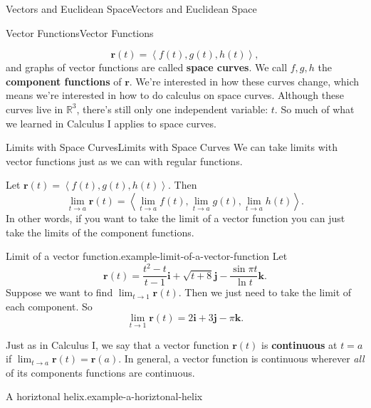 \documentclass[10pt,]{book}
\newcommand{\terminology}[1]{\textbf{#1}}
\numberwithin{equation}{section}
\newcommand{\RR}{\mathbb{R}}
\newcommand{\vv}[1]{\mathbf{#1}}
\newcommand{\dotprod}[1]{\left\langle #1 \right\rangle}
\begin{document}
\begin{chapterptx}{Vectors and Euclidean Space}{}{Vectors and Euclidean Space}{}{}
\begin{sectionptx}{Vector Functions}{}{Vector Functions}{}{}
\begin{introduction}{}
\begin{equation*}
\vv{r}(t) = \dotprod{f(t),g(t),h(t)},
\end{equation*}
and graphs of vector functions are called \terminology{space curves}. We call \(f,g,h\) the \terminology{component functions} of \(\vv{r}\). We're interested in how these curves change, which means we're interested in how to do calculus on space curves. Although these curves live in \(\RR^{3}\), there's still only one independent variable: \(t\). So much of what we learned in Calculus I applies to space curves.%
\end{introduction}%
%
%
\typeout{************************************************}
\typeout{************************************************}
%
\begin{subsectionptx}{Limits with Space Curves}{}{Limits with Space Curves}{}{}\label{limits-with-space-curves}
\hypertarget{p-1034}{}%
We can take limits with vector functions just as we can with regular functions.%
\par
\hypertarget{p-1035}{}%
Let \(\vv{r}(t) = \dotprod{f(t),g(t),h(t)}\). Then%
%
\begin{equation}
\lim_{t\to a}\vv{r}(t) = \dotprod{\lim_{t\to a}f(t),\lim_{t\to a}g(t),\lim_{t\to a}h(t)}.\label{limits-vector-functions}
\end{equation}
\hypertarget{p-1036}{}%
In other words, if you want to take the limit of a vector function you can just take the limits of the component functions.%
\begin{example}{Limit of a vector function.}{example-limit-of-a-vector-function}%
\hypertarget{p-1037}{}%
Let%
%
\begin{equation*}
\vv{r}(t) = \frac{t^{2}-t}{t-1}\vv{i} + \sqrt{t+8}\vv{j} - \frac{\sin\pi t}{\ln t}\vv{k}.
\end{equation*}
\hypertarget{p-1038}{}%
Suppose we want to find \(\lim_{t\to 1}\vv{r}(t)\). Then we just need to take the limit of each component. So%
%
\begin{equation*}
\lim_{t\to1}\vv{r}(t) = 2\vv{i}+3\vv{j} -\pi\vv{k}.
\end{equation*}
\end{example}
\hypertarget{p-1039}{}%
Just as in Calculus I, we say that a vector function \(\vv{r}(t)\) is \terminology{continuous} at \(t=a\) if \(\lim_{t\to a}\vv{r}(t) = \vv{r}(a)\). In general, a vector function is continuous wherever \emph{all} of its components functions are continuous.%
\begin{example}{A horiztonal helix.}{example-a-horiztonal-helix}%

\end{example}
\end{subsectionptx}
\end{sectionptx}
\end{chapterptx}
\end{document}
